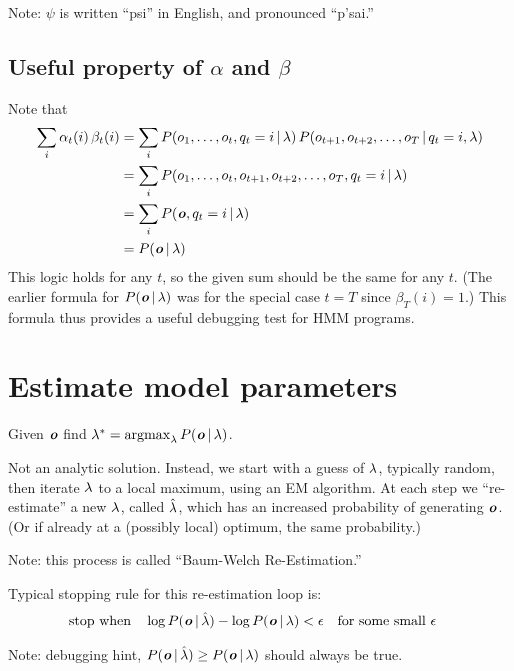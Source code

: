 Note: $\psi$ is written ``psi'' in English, and pronounced ``p'sai.''

\subsection{Useful property of $\alpha$ and $\beta$}

Note that
\begin{equation}
  \begin{split}
    \sum_i \alpha_t(i) \, \beta_t(i) &=
    \sum_i P(o_1, \ldots,o_t,q_t=i \operatorname*{\vert} \lambda)
    \,
    P(o_{t+1}, o_{t+2}, \ldots, o_T \operatorname*{\vert} q_t = i, \lambda)
    \\
    &=
    \sum_i P(o_1, \ldots,o_t,o_{t+1}, o_{t+2}, \ldots, o_T,q_t=i \operatorname*{\vert} \lambda)
    \\
    &=
    \sum_i P(\boldsymbol{\mathit{o}}, q_t=i \operatorname*{\vert} \lambda)
    \\
    &= P(\boldsymbol{\mathit{o}} \operatorname*{\vert} \lambda)
  \end{split}
\end{equation}
This logic holds for any $t$, so the given sum should be the same for
any $t$.  (The earlier formula for $P(\boldsymbol{\mathit{o}} \operatorname*{\vert} \lambda)$ was for
the special case $t=T$ since $\beta_T(i)=1$.)  This formula thus
provides a useful debugging test for HMM programs.

\section{Estimate model parameters}

Given $\boldsymbol{\mathit{o}}$ find $\lam^* = \argmax_{\lam} P(\vv{o} \given \lam)$.

Not an analytic solution.  Instead, we start with a guess of
$\lambda$, typically random, then iterate $\lambda$ to a local
maximum, using an EM algorithm.  At each step we ``re-estimate'' a new
$\lambda$, called $\hat{\lambda}$, which has an increased probability
of generating $\boldsymbol{\mathit{o}}$.  (Or if already at a (possibly local)
optimum, the same probability.)

Note: this process is called ``Baum-Welch Re-Estimation.''

Typical stopping rule for this re-estimation loop is:
\begin{align}
  \text{stop when} \quad
  \log P(\boldsymbol{\mathit{o}} \operatorname*{\vert} \hat{\lambda})
  - \log P(\boldsymbol{\mathit{o}} \operatorname*{\vert} \lambda)
  &< \epsilon
  \quad \text{for some small $\epsilon$}
\end{align}

Note: debugging hint, $P(\boldsymbol{\mathit{o}} \operatorname*{\vert} \hat{\lambda}) \geq P(\boldsymbol{\mathit{o}}
\operatorname*{\vert} \lambda)$ should always be true.

